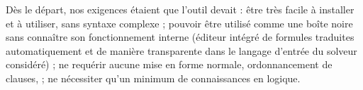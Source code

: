 



Dès le départ, nos exigences étaient que l'outil devait :
%
être très facile à installer et à utiliser, sans syntaxe complexe ; 
%
pouvoir être utilisé comme une boîte noire sans connaître son fonctionnement interne  (éditeur intégré de formules traduites automatiquement et de manière transparente dans le langage d'entrée du solveur considéré) ;
%
ne requérir aucune mise en forme normale,  ordonnancement de clauses, \etc ;
%
ne nécessiter qu'un minimum de connaissances en logique.


